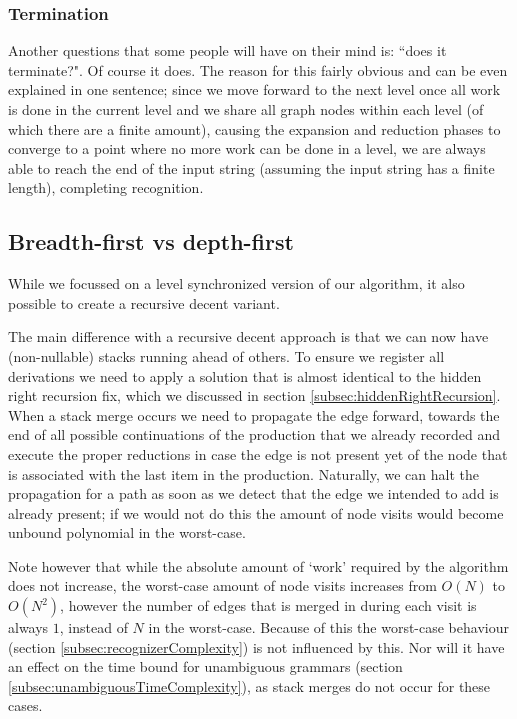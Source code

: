 \documentclass[a4paper,10pt]{article}
\begin{document}
\subsubsection{Termination}
Another questions that some people will have on their mind is: ``does it terminate?". Of course it does. The reason for this fairly obvious and can be even explained in one sentence; since we move forward to the next level once all work is done in the current level and we share all graph nodes within each level (of which there are a finite amount), causing the expansion and reduction phases to converge to a point where no more work can be done in a level, we are always able to reach the end of the input string (assuming the input string has a finite length), completing recognition.

\subsection{Breadth-first vs depth-first}
\label{sec:breadthFirstVsDepthFirst}

While we focussed on a level synchronized version of our algorithm, it also possible to create a recursive decent variant.

The main difference with a recursive decent approach is that we can now have (non-nullable) stacks running ahead of others. To ensure we register all derivations we need to apply a solution that is almost identical to the hidden right recursion fix, which we discussed in section \ref{subsec:hiddenRightRecursion}. When a stack merge occurs we need to propagate the edge forward, towards the end of all possible continuations of the production that we already recorded and execute the proper reductions in case the edge is not present yet of the node that is associated with the last item in the production. Naturally, we can halt the propagation for a path as soon as we detect that the edge we intended to add is already present; if we would not do this the amount of node visits would become unbound polynomial in the worst-case.

Note however that while the absolute amount of `work' required by the algorithm does not increase, the worst-case amount of node visits increases from $O(N)$ to $O(N^2)$, however the number of edges that is merged in during each visit is always $1$, instead of $N$ in the worst-case. Because of this the worst-case behaviour (section \ref{subsec:recognizerComplexity}) is not influenced by this. Nor will it have an effect on the time bound for unambiguous grammars (section \ref{subsec:unambiguousTimeComplexity}), as stack merges do not occur for these cases.
\end{document}
